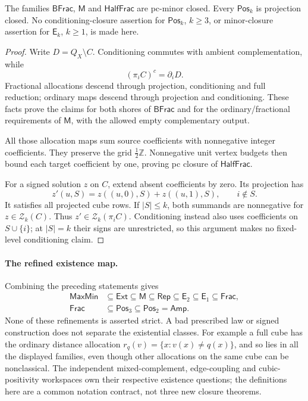 \begin{proposition}
\label{prop:atlas-refinement-minor-closure}
The families $\mathsf{BFrac}$, $\mathsf M$ and
$\mathsf{HalfFrac}$ are pc-minor closed.
Every $\mathsf{Pos}_k$ is projection closed.
No conditioning-closure assertion for $\mathsf{Pos}_k$, $k\ge3$, or
minor-closure assertion for $\mathsf E_k$, $k\ge1$, is made here.
\end{proposition}
\begin{proof}
Write $D=Q_X\setminus C$. Conditioning commutes with ambient
complementation, while
\[
 (\pi_i C)^c=\partial_i D.
\]
Fractional allocations descend through projection, conditioning and
full reduction; ordinary maps descend through projection and
conditioning. These facts prove the claims for both shores of
$\mathsf{BFrac}$ and for the ordinary/fractional requirements of
$\mathsf M$, with the allowed empty complementary output.

All those allocation maps sum source coefficients with nonnegative
integer coefficients. They preserve the grid $\tfrac12\mathbb Z$.
Nonnegative unit vertex budgets then bound each target coefficient
by one, proving pc closure of $\mathsf{HalfFrac}$.

For a signed solution $z$ on $C$, extend absent coefficients by zero.
Its projection has
\[
 z'(u,S)=z((u,0),S)+z((u,1),S),\qquad i\notin S.
\]
It satisfies all projected cube rows. If $|S|\le k$, both summands
are nonnegative for $z\in\mathcal Z_k(C)$.
Thus $z'\in\mathcal Z_k(\pi_i C)$.
Conditioning instead also uses coefficients on $S\cup\{i\}$;
at $|S|=k$ their signs are unrestricted, so this argument makes
no fixed-level conditioning claim.
\end{proof}

\paragraph{The refined existence map.}
Combining the preceding statements gives
\[
 \begin{aligned}
 \mathsf{MaxMin}&\subseteq\mathsf{Ext}\subseteq\mathsf M
 \subseteq\mathsf{Rep}\subseteq\mathsf E_2\subseteq\mathsf E_1
 \subseteq\mathsf{Frac},\\
 \mathsf{Frac}&\subseteq\mathsf{Pos}_3\subseteq\mathsf{Pos}_2
 =\mathsf{Amp}.
 \end{aligned}
\]
None of these refinements is asserted strict. A bad prescribed law or
signed construction does not separate the existential classes.
For example a full cube has the ordinary distance allocation
$r_q(v)=\{x:v(x)\ne q(x)\}$, and so lies in all the displayed families,
even though other allocations on the same cube can be nonclassical.
The independent mixed-complement, edge-coupling and cubic-positivity
workspaces own their respective existence questions; the definitions here
are a common notation contract, not three new closure theorems.


